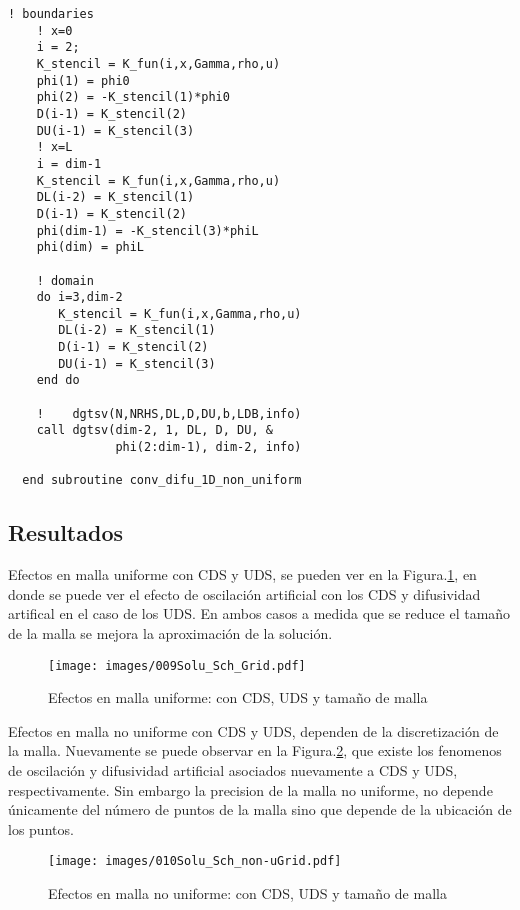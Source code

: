 \documentclass[9pt,technote,twoside,letterpaper,onecolumn]{IEEEtran}
\begin{document}
\begin{multicols}{2}
\begin{lstlisting}[caption={Algoritmo solución Difusión-Convección estacionario},label={lst:impl_dif_conv}]
    ! boundaries
    ! x=0
    i = 2;
    K_stencil = K_fun(i,x,Gamma,rho,u)
    phi(1) = phi0
    phi(2) = -K_stencil(1)*phi0
    D(i-1) = K_stencil(2)
    DU(i-1) = K_stencil(3)
    ! x=L
    i = dim-1
    K_stencil = K_fun(i,x,Gamma,rho,u)
    DL(i-2) = K_stencil(1)
    D(i-1) = K_stencil(2)
    phi(dim-1) = -K_stencil(3)*phiL
    phi(dim) = phiL
    
    ! domain
    do i=3,dim-2
       K_stencil = K_fun(i,x,Gamma,rho,u)
       DL(i-2) = K_stencil(1)
       D(i-1) = K_stencil(2)
       DU(i-1) = K_stencil(3)        
    end do
    
    !    dgtsv(N,NRHS,DL,D,DU,b,LDB,info)
    call dgtsv(dim-2, 1, DL, D, DU, &
               phi(2:dim-1), dim-2, info)

  end subroutine conv_difu_1D_non_uniform
\end{lstlisting}

\subsection{Resultados}
\label{sec:res_sol_con_dif}

Efectos en malla uniforme con CDS y UDS, se pueden ver en la Figura.\ref{fig:sch_grid}, en donde se puede ver el efecto de oscilación artificial con los CDS y difusividad artifical en el caso de los UDS. En ambos casos a medida que se reduce el tamaño de la malla se mejora la aproximación de la solución.
\begin{figure}[H]
  \centering
  \texttt{[image: images/009Solu\_Sch\_Grid.pdf]}\\
  \label{fig:sch_grid}
  \caption{Efectos en malla uniforme: con CDS, UDS y tamaño de malla}
\end{figure}

Efectos en malla no uniforme con CDS y UDS, dependen de la discretización de la malla. Nuevamente se puede observar en la Figura.\ref{fig:sch_n-ugrid}, que existe los fenomenos de oscilación y difusividad artificial asociados nuevamente a CDS y UDS, respectivamente. Sin embargo la precision de la malla no uniforme, no depende únicamente del número de puntos de la malla sino que depende de la ubicación de los puntos.
\begin{figure}[H]
  \centering
  \texttt{[image: images/010Solu\_Sch\_non-uGrid.pdf]}\\
  \label{fig:sch_n-ugrid}
  \caption{Efectos en malla no uniforme: con CDS, UDS y tamaño de malla}
\end{figure}


\end{multicols}
\end{document}
